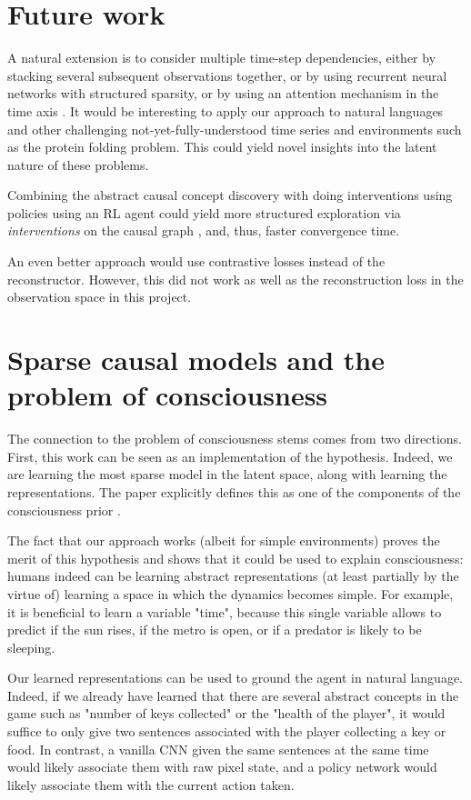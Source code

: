 \documentclass[a4paper,11pt,oneside]{report}
\begin{document}
\section{Future work}
A natural extension is to consider multiple time-step dependencies, either by stacking several subsequent observations together, or by using recurrent neural networks with structured sparsity, or by using an attention mechanism in the time axis \cite{Nauta2019}. It would be interesting to apply our approach to natural languages and other challenging not-yet-fully-understood time series and environments such as the protein folding problem. This could yield novel insights into the latent nature of these problems.

Combining the abstract causal concept discovery with doing interventions using policies \cite{Volodin2020} using an RL agent could yield more structured exploration via {\em interventions} on the causal graph \cite{He2008,Frisch2014,Pathak2017,Dasgupta2019}, and, thus, faster convergence time.

An even better approach would use contrastive losses \cite{VanDenOord2018,Kipf2020,Mohammadi2020} instead of the reconstructor. However, this did not work as well as the reconstruction loss in the observation space in this project.

\section{Sparse causal models and the problem of consciousness}
The connection to the problem of consciousness stems comes from two directions. First, this work can be seen as an implementation of the \cite{Bengio2017} hypothesis. Indeed, we are learning the most sparse model in the latent space, along with learning the representations. The paper explicitly defines this as one of the components of the consciousness prior \cite{Bengio2017}.


The fact that our approach works (albeit for simple environments) proves the merit of this hypothesis and shows that it could be used to explain consciousness: humans indeed can be learning abstract representations (at least partially by the virtue of) learning a space in which the dynamics becomes simple. For example, it is beneficial to learn a variable "time", because this single variable allows to predict if the sun rises, if the metro is open, or if a predator is likely to be sleeping.

Our learned representations can be used to ground the agent in natural language. Indeed, if we already have learned that there are several abstract concepts in the game such as "number of keys collected" or the "health of the player", it would suffice to only give two sentences associated with the player collecting a key or food. In contrast, a vanilla CNN given the same sentences at the same time would likely associate them with raw pixel state, and a policy network would likely associate them with the current action taken.
\end{document}
